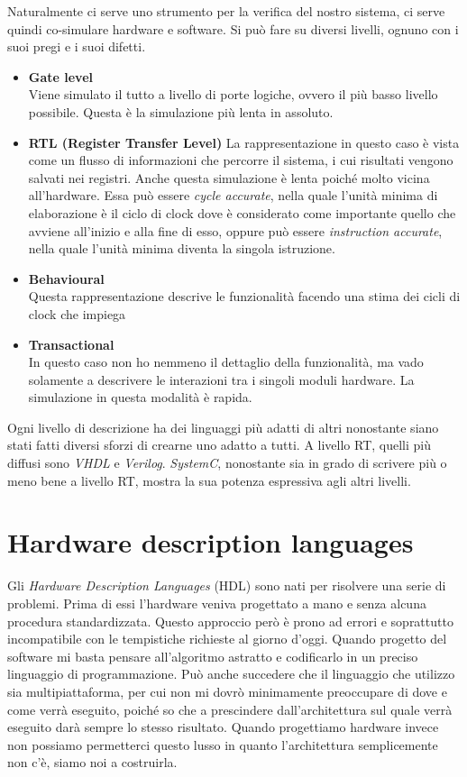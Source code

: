 \documentclass[10pt,a4paper,oneside]{scrbook}
\begin{document}
Naturalmente ci serve uno strumento per la verifica del nostro sistema, ci serve quindi co-simulare hardware e software.
Si può fare su diversi livelli, ognuno con i suoi pregi e i suoi difetti.
\begin{itemize}
	\item \textbf{Gate level}\\
	Viene simulato il tutto a livello di porte logiche, ovvero il più basso livello
	possibile. Questa è la simulazione più lenta in assoluto.
	\item \textbf{RTL (Register Transfer Level)}
	La rappresentazione in questo caso è vista come un flusso di informazioni che
	percorre il sistema, i cui risultati vengono salvati nei registri. Anche questa
	simulazione è lenta poiché molto vicina all'hardware.
	Essa può essere \textit{cycle accurate}, nella quale l'unità minima di elaborazione è il ciclo
	di clock dove è considerato come importante quello che avviene all'inizio e alla fine di esso,
	oppure può essere \textit{instruction accurate}, nella quale l'unità minima diventa la singola istruzione.
	\item \textbf{Behavioural}\\
	Questa rappresentazione descrive le funzionalità facendo una stima dei cicli di clock che impiega
	\item \textbf{Transactional}\\
	In questo caso non ho nemmeno il dettaglio della funzionalità, ma vado solamente a descrivere
	le interazioni tra i singoli moduli hardware. La simulazione in questa modalità è rapida.
\end{itemize}

Ogni livello di descrizione ha dei linguaggi più adatti di altri nonostante siano stati fatti diversi
sforzi di crearne uno adatto a tutti.
A livello RT, quelli più diffusi sono \textit{VHDL} e \textit{Verilog}.
\textit{SystemC}, nonostante sia in grado di scrivere più o meno bene a livello RT, mostra la sua
potenza espressiva agli altri livelli.

\section{Hardware description languages}
Gli \textit{Hardware Description Languages} (HDL) sono nati per risolvere una serie di problemi.
Prima di essi l'hardware veniva progettato a mano e senza alcuna procedura standardizzata. Questo
approccio però è prono ad errori e soprattutto incompatibile con le tempistiche richieste al giorno d'oggi.
Quando progetto del software mi basta pensare all'algoritmo astratto e codificarlo in un preciso linguaggio
di programmazione. Può anche succedere che il linguaggio che utilizzo sia multipiattaforma, per cui non mi dovrò
minimamente preoccupare di dove e come verrà eseguito, poiché so che a prescindere dall'architettura sul quale
verrà eseguito darà sempre lo stesso risultato.
Quando progettiamo hardware invece non possiamo permetterci questo lusso in quanto l'architettura semplicemente
non c'è, siamo noi a costruirla.
\end{document}
